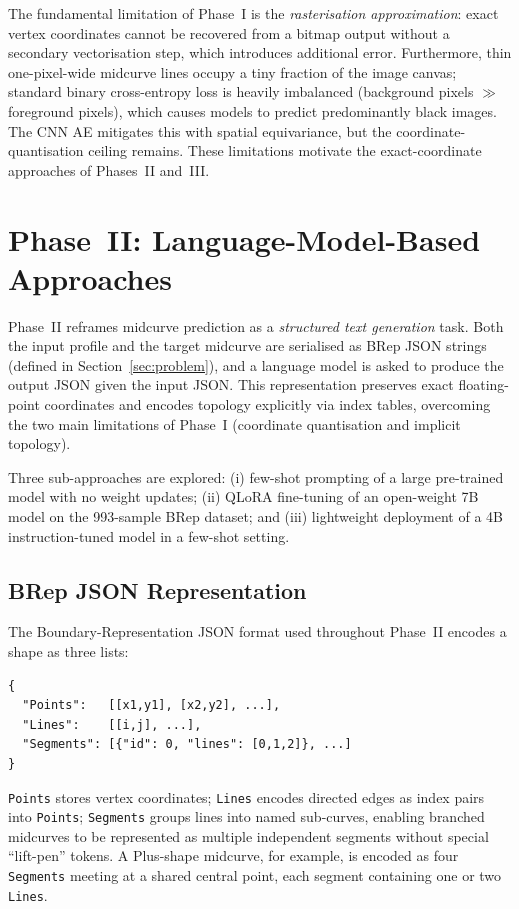 \documentclass[journal]{IEEEtran}
\begin{document}
The fundamental limitation of Phase~I is the \emph{rasterisation
approximation}: exact vertex coordinates cannot be recovered from a bitmap
output without a secondary vectorisation step, which introduces additional
error.  Furthermore, thin one-pixel-wide midcurve lines occupy a tiny fraction
of the image canvas; standard binary cross-entropy loss is heavily imbalanced
(background pixels $\gg$ foreground pixels), which causes models to predict
predominantly black images.  The CNN AE mitigates this with spatial
equivariance, but the coordinate-quantisation ceiling remains.  These
limitations motivate the exact-coordinate approaches of Phases~II and~III.

\section{Phase~II: Language-Model-Based Approaches}
\label{sec:phase2}

Phase~II reframes midcurve prediction as a \emph{structured text generation}
task.  Both the input profile and the target midcurve are serialised as BRep
JSON strings (defined in Section~\ref{sec:problem}), and a language model is
asked to produce the output JSON given the input JSON.  This representation
preserves exact floating-point coordinates and encodes topology explicitly via
index tables, overcoming the two main limitations of Phase~I (coordinate
quantisation and implicit topology).

Three sub-approaches are explored: (i) few-shot prompting of a large pre-trained
model with no weight updates; (ii) QLoRA fine-tuning of an open-weight 7B model
on the 993-sample BRep dataset; and (iii) lightweight deployment of a 4B
instruction-tuned model in a few-shot setting.

\subsection{BRep JSON Representation}

The Boundary-Representation JSON format used throughout Phase~II encodes a
shape as three lists:
\begin{lstlisting}[language={}]
{
  "Points":   [[x1,y1], [x2,y2], ...],
  "Lines":    [[i,j], ...],
  "Segments": [{"id": 0, "lines": [0,1,2]}, ...]
}
\end{lstlisting}
\texttt{Points} stores vertex coordinates; \texttt{Lines} encodes directed
edges as index pairs into \texttt{Points}; \texttt{Segments} groups lines into
named sub-curves, enabling branched midcurves to be represented as multiple
independent segments without special ``lift-pen'' tokens.  A Plus-shape
midcurve, for example, is encoded as four \texttt{Segments} meeting at a shared
central point, each segment containing one or two \texttt{Lines}.
\end{document}
